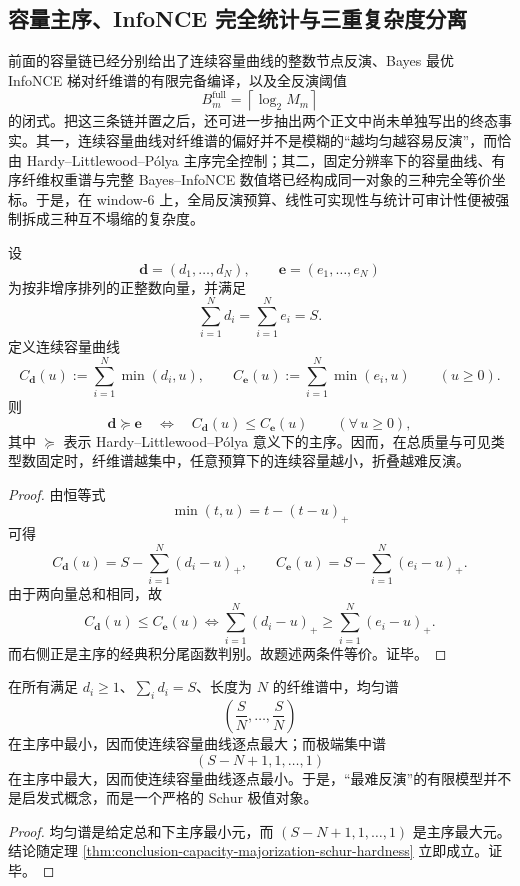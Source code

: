 \subsection{容量主序、InfoNCE 完全统计与三重复杂度分离}\label{subsec:conclusion-capacity-majorization-infonce-complexity-separation}
前面的容量链已经分别给出了连续容量曲线的整数节点反演、Bayes 最优 InfoNCE 梯对纤维谱的有限完备编译，以及全反演阈值
\[
B_m^{\mathrm{full}}=\left\lceil \log_2 M_m\right\rceil
\]
的闭式。把这三条链并置之后，还可进一步抽出两个正文中尚未单独写出的终态事实。其一，连续容量曲线对纤维谱的偏好并不是模糊的“越均匀越容易反演”，而恰由 Hardy--Littlewood--P\'olya 主序完全控制；其二，固定分辨率下的容量曲线、有序纤维权重谱与完整 Bayes--InfoNCE 数值塔已经构成同一对象的三种完全等价坐标。于是，在 window-\(6\) 上，全局反演预算、线性可实现性与统计可审计性便被强制拆成三种互不塌缩的复杂度。

\begin{theorem}\label{thm:conclusion-capacity-majorization-schur-hardness}
设
\[
\mathbf d=(d_1,\dots,d_N),
\qquad
\mathbf e=(e_1,\dots,e_N)
\]
为按非增序排列的正整数向量，并满足
\[
\sum_{i=1}^N d_i=\sum_{i=1}^N e_i=S.
\]
定义连续容量曲线
\[
C_{\mathbf d}(u):=\sum_{i=1}^N \min(d_i,u),
\qquad
C_{\mathbf e}(u):=\sum_{i=1}^N \min(e_i,u)
\qquad (u\ge 0).
\]
则
\[
\mathbf d\succcurlyeq \mathbf e
\quad\Longleftrightarrow\quad
C_{\mathbf d}(u)\le C_{\mathbf e}(u)
\qquad (\forall\,u\ge 0),
\]
其中 \(\succcurlyeq\) 表示 Hardy--Littlewood--P\'olya 意义下的主序。因而，在总质量与可见类型数固定时，纤维谱越集中，任意预算下的连续容量越小，折叠越难反演。
\end{theorem}
\begin{proof}
由恒等式
\[
\min(t,u)=t-(t-u)_+
\]
可得
\[
C_{\mathbf d}(u)
=
S-\sum_{i=1}^N(d_i-u)_+,
\qquad
C_{\mathbf e}(u)
=
S-\sum_{i=1}^N(e_i-u)_+.
\]
由于两向量总和相同，故
\[
C_{\mathbf d}(u)\le C_{\mathbf e}(u)
\iff
\sum_{i=1}^N(d_i-u)_+\ge \sum_{i=1}^N(e_i-u)_+.
\]
而右侧正是主序的经典积分尾函数判别。故题述两条件等价。证毕。
\end{proof}

\begin{corollary}\label{cor:conclusion-capacity-majorization-extremizers}
在所有满足 \(d_i\ge 1\)、\(\sum_i d_i=S\)、长度为 \(N\) 的纤维谱中，均匀谱
\[
\left(\frac{S}{N},\dots,\frac{S}{N}\right)
\]
在主序中最小，因而使连续容量曲线逐点最大；而极端集中谱
\[
(S-N+1,1,\dots,1)
\]
在主序中最大，因而使连续容量曲线逐点最小。于是，“最难反演”的有限模型并不是启发式概念，而是一个严格的 Schur 极值对象。
\end{corollary}
\begin{proof}
均匀谱是给定总和下主序最小元，而 \((S-N+1,1,\dots,1)\) 是主序最大元。结论随定理 \ref{thm:conclusion-capacity-majorization-schur-hardness} 立即成立。证毕。
\end{proof}

